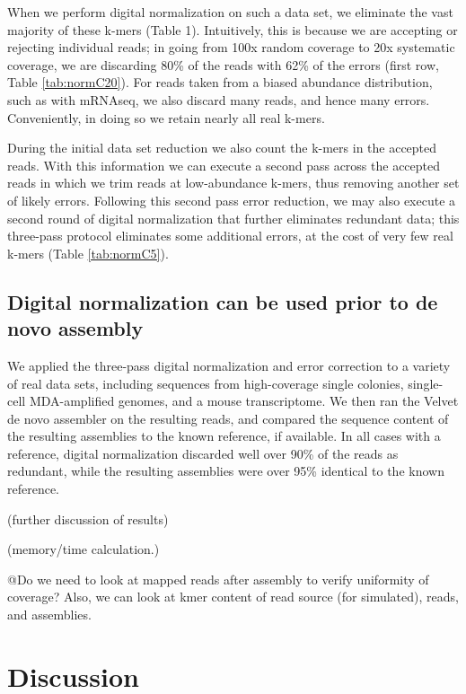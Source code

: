 \documentclass[10pt]{article}
\begin{document}
When we perform digital normalization on such a data set, we eliminate
the vast majority of these k-mers (Table 1).  Intuitively, this is
because we are accepting or rejecting individual reads; in going from
100x random coverage to 20x systematic coverage, we are discarding
80\% of the reads with 62\% of the errors (first row, Table \ref{tab:normC20}).
For reads taken from a biased abundance distribution, such as with
mRNAseq, we also discard many reads, and hence many errors.
Conveniently, in doing so we retain nearly all real k-mers.

During the initial data set reduction we also count the k-mers in the
accepted reads.  With this information we can execute a second pass
across the accepted reads in which we trim reads at low-abundance
k-mers, thus removing another set of likely errors.  Following this
second pass error reduction, we may also execute a second round of
digital normalization that further eliminates redundant data; this
three-pass protocol eliminates some additional errors, at the cost
of very few real k-mers (Table \ref{tab:normC5}).

\subsection*{Digital normalization can be used prior to de novo assembly}

We applied the three-pass digital normalization and error correction
to a variety of real data sets, including sequences from high-coverage
single colonies, single-cell MDA-amplified genomes, and a mouse
transcriptome.  We then ran the Velvet de novo assembler on the
resulting reads, and compared the sequence content of the resulting
assemblies to the known reference, if available.  In all cases with
a reference, digital normalization discarded well over 90\% of the
reads as redundant, while the resulting assemblies were over 95\%
identical to the known reference.

(further discussion of results)

(memory/time calculation.)

@Do we need to look at mapped reads after assembly to verify uniformity
of coverage? Also, we can look at kmer content of read source (for
simulated), reads, and assemblies.

\section*{Discussion}
\end{document}
